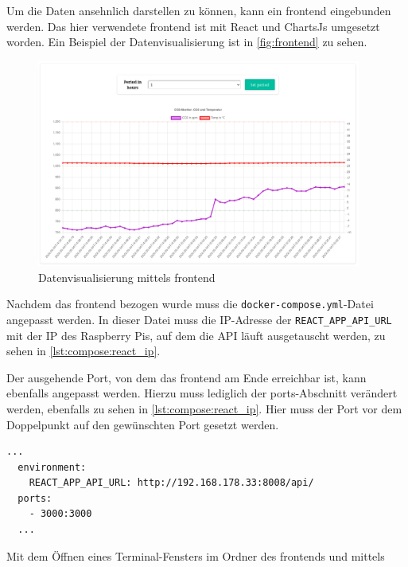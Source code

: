\documentclass[a4paper,
    12pt,
    headings=small,
    ngerman,
    listof=totoc,
    numbers=noenddot]{scrreprt}[2021/11/13]
\begin{document}
Um die Daten ansehnlich darstellen zu können, kann ein \gls{frontend} eingebunden werden. Das hier verwendete \gls{frontend} ist mit React \autocite{reactjs} und ChartsJs \autocite{chart.js} umgesetzt worden. Ein Beispiel der Datenvisualisierung ist in \vref{fig:frontend} zu sehen.

\begin{figure}[htbp]
  \centering
  \includegraphics[width=0.95\textwidth]{pictures/Frontend.png}
  \caption{Datenvisualisierung mittels \gls{frontend}}
  \label{fig:frontend}
\end{figure}

Nachdem das \gls{frontend} bezogen wurde muss die \texttt{docker-compose.yml}-Datei angepasst werden. In dieser Datei muss die IP-Adresse der \texttt{REACT\_APP\_API\_URL} mit der IP des Raspberry Pis, auf dem die \ac{API} läuft ausgetauscht werden, zu sehen in \vref{lst:compose:react_ip}.

Der ausgehende Port, von dem das \gls{frontend} am Ende erreichbar ist, kann ebenfalls angepasst werden. Hierzu muss lediglich der ports-Abschnitt verändert werden, ebenfalls zu sehen in \vref{lst:compose:react_ip}. Hier muss der Port vor dem Doppelpunkt auf den gewünschten Port gesetzt werden.

\begin{lstlisting}[language=docker-compose-2,caption={Anpassen der \ac{API}-IP und des Ports in der docker-compose.yml},breaklines=true,label={lst:compose:react_ip}]
  ...
  environment:
    REACT_APP_API_URL: http://192.168.178.33:8008/api/
  ports:
    - 3000:3000
  ...
\end{lstlisting}

Mit dem Öffnen eines Terminal-Fensters im Ordner des \gls{frontend}s und mittels
\end{document}

